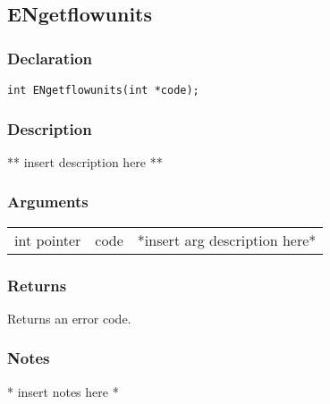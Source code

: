 \subsection{ENgetflowunits}
\subsubsection{Declaration}
\begin{lstlisting}
int ENgetflowunits(int *code);
\end{lstlisting}
\subsubsection{Description}
** insert description here **
\subsubsection{Arguments}
\begin{tabular}{l r p{11cm} }
int pointer&code&*insert arg description here* \\[6pt]
\end{tabular}
\subsubsection{Returns}
Returns an error code.
\subsubsection{Notes}
* insert notes here *